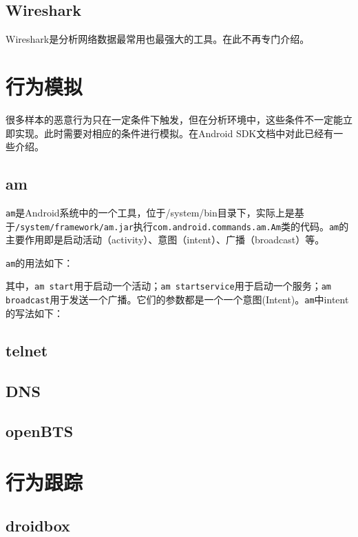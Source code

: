 \subsection{Wireshark}
Wireshark\cite{url:wireshark}是分析网络数据最常用也最强大的工具。在此不再专门介绍。

\section{行为模拟}
很多样本的恶意行为只在一定条件下触发，但在分析环境中，这些条件不一定能立即实现。此时需要对相应的条件进行模拟。在Android SDK文档中对此已经有一些介绍\cite{url:android_using_emulator}。

\subsection{am}
\lstinline!am!是Android系统中的一个工具，位于/system/bin目录下，实际上是基于\lstinline!/system/framework/am.jar!执行\lstinline!com.android.commands.am.Am!类的代码。\lstinline!am!的主要作用即是启动活动（activity）、意图（intent）、广播（broadcast）等。

\lstinline!am!的用法如下：


其中，\lstinline!am start!用于启动一个活动；\lstinline!am startservice!用于启动一个服务；\lstinline!am broadcast!用于发送一个广播。它们的参数都是一个一个意图(Intent)。\lstinline!am!中intent的写法如下：


\subsection{telnet}

\subsection{DNS}

\subsection{openBTS}

\section{行为跟踪}
\subsection{droidbox}
